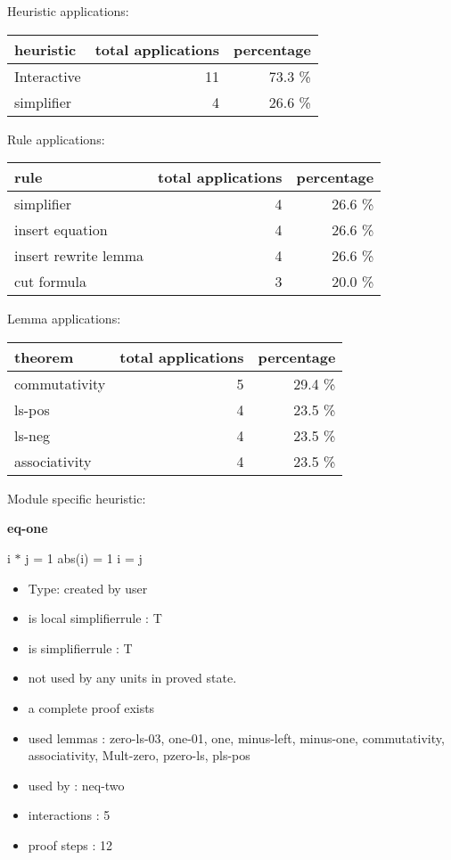 \documentclass[a4paper]{article}
\begin{document}
\medskip


Heuristic applications:

\begin{supertabular}{l|r|r}
heuristic	& total applications & percentage \\ \hline
Interactive & 11 & 73.3 \% \\
simplifier & 4 & 26.6 \% \\

\end{supertabular}

Rule applications:

\begin{supertabular}{l|r|r}
rule	        & total applications & percentage \\ \hline
simplifier & 4 & 26.6 \% \\
insert equation & 4 & 26.6 \% \\
insert rewrite lemma & 4 & 26.6 \% \\
cut formula & 3 & 20.0 \% \\

\end{supertabular}

Lemma applications:

\begin{supertabular}{l|r|r}
theorem	        & total applications & percentage \\ \hline
commutativity & 5 & 29.4 \% \\
ls-pos & 4 & 23.5 \% \\
ls-neg & 4 & 23.5 \% \\
associativity & 4 & 23.5 \% \\

\end{supertabular}

Module specific heuristic:

\pagebreak

{\LARGE\bf eq-one}\label{lemma-eq-one}

\medskip

 \Fol i $*$ j = 1 \Equiv abs(i) = 1 \And i = j

\begin{itemize}

\item Type: created by user

\item is local simplifierrule : T
\item is simplifierrule : T
\item not used by any units in proved state.
\item       a complete proof exists
\item       used lemmas  : zero-ls-03, one-01, one, minus-left, minus-one, commutativity, associativity, Mult-zero, pzero-ls, pls-pos
\item       used by      : neq-two
\item       interactions : 5
\item       proof steps  : 12
\end{itemize}
\end{document}
